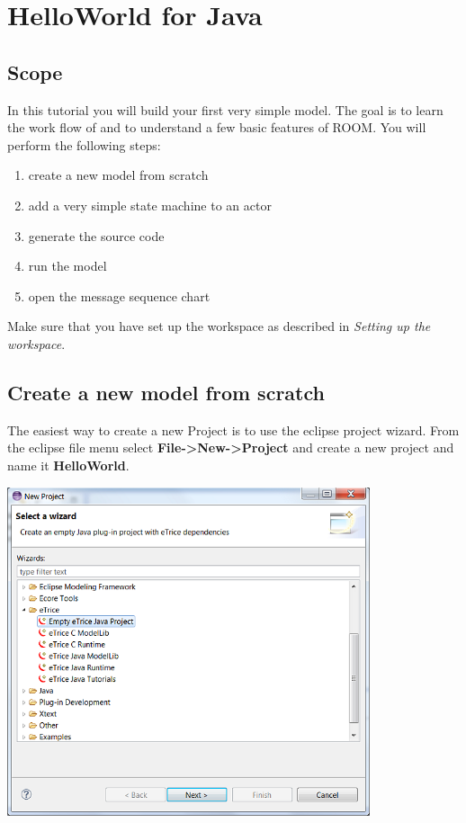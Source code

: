 \section{HelloWorld for Java}

\subsection{Scope}

In this tutorial you will build your first very simple \eTrice{} model. The goal is to learn the work flow of 
\eTrice{} and to understand a few basic features of ROOM. You will perform the following steps:

\begin{enumerate}
\item create a new model from scratch
\item add a very simple state machine to an actor
\item generate the source code
\item run the model
\item open the message sequence chart
\end{enumerate}

Make sure that you have set up the workspace as described in \textit{Setting up the workspace}.

\subsection{Create a new model from scratch}

The easiest way to create a new \eTrice{} Project is to use the eclipse project wizard. From the eclipse file 
menu select \textbf{File->New->Project} and create a new \eTrice{} project and name it \textbf{HelloWorld}.

\includegraphics[width=0.8\textwidth]{images/015-HelloWorld10.png}

